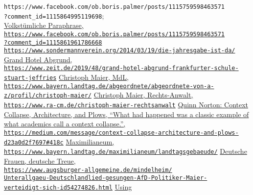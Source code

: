 \documentclass[a4,parindent=0pt]{article}
\begin{document}
\begin{thebibliography}{88}
{\texttt{https://www.facebook.com/ob.boris.palmer/posts/1115759598463571\\?comment\_id=1115864995119698}};\\
\href{https://www.facebook.com/ob.boris.palmer/posts/1115759598463571?comment_id=1115861961786668}{Volkstümliche Paraphrase,\\
\texttt{https://www.facebook.com/ob.boris.palmer/posts/1115759598463571\\?comment\_id=1115861961786668}}
  \href{https://www.sondermannverein.org/2014/03/19/die-jahresgabe-ist-da/}{\texttt{https://www.sondermannverein.org/2014/03/19/die-jahresgabe-ist-da/}}
  \href{https://www.zeit.de/2019/48/grand-hotel-abgrund-frankfurter-schule-stuart-jeffries}{Grand
  Hotel Abgrund,\\
\texttt{https://www.zeit.de/2019/48/grand-hotel-abgrund-frankfurter-schule-stuart-jeffries}}
  \href{https://www.bayern.landtag.de/abgeordnete/abgeordnete-von-a-z/profil/christoph-maier/}{Christoph
  Maier, MdL,\\
\texttt{https://www.bayern.landtag.de/abgeordnete/abgeordnete-von-a-z/profil/christoph-maier/}}
  \href{https://www.ra-cm.de/christoph-maier-rechtsanwalt}{Christoph
  Maier, Rechts-Anwalt,\\
\texttt{https://www.ra-cm.de/christoph-maier-rechtsanwalt}}
  \href{https://medium.com/message/context-collapse-architecture-and-plows-d23a0d2f7697#418c}{Quinn Norton: Context Collapse, Architecture, and Plows, 
``What had happened was a classic example of what academics call a context collapse.'',\\
\texttt{https://medium.com/message/context-collapse-architecture-and-plows-d23a0d2f7697\#418c}}
  \href{https://www.bayern.landtag.de/maximilianeum/landtagsgebaeude/}{Maximilianeum,\\
\texttt{https://www.bayern.landtag.de/maximilianeum/landtagsgebaeude/}}
  \href{https://www.augsburger-allgemeine.de/mindelheim/Unterallgaeu-Deutschlandlied-gesungen-AfD-Politiker-Maier-verteidigt-sich-id54274826.html}{Deutsche
  Frauen, deutsche Treue,\\
\texttt{https://www.augsburger-allgemeine.de/mindelheim/\\Unterallgaeu-Deutschlandlied-gesungen-AfD-Politiker-Maier-\\verteidigt-sich-id54274826.html}}
  \href{https://bitbucket.org/tatzelbrumm/contextcollapse/src/videos/}{Using
}
\end{thebibliography}
\end{document}
